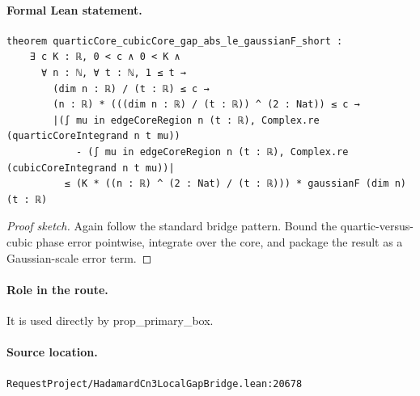 \medskip
\paragraph{Formal Lean statement.}
\begin{verbatim}
theorem quarticCore_cubicCore_gap_abs_le_gaussianF_short :
    ∃ c K : ℝ, 0 < c ∧ 0 < K ∧
      ∀ n : ℕ, ∀ t : ℕ, 1 ≤ t →
        (dim n : ℝ) / (t : ℝ) ≤ c →
        (n : ℝ) * (((dim n : ℝ) / (t : ℝ)) ^ (2 : Nat)) ≤ c →
        |(∫ mu in edgeCoreRegion n (t : ℝ), Complex.re (quarticCoreIntegrand n t mu))
            - (∫ mu in edgeCoreRegion n (t : ℝ), Complex.re (cubicCoreIntegrand n t mu))|
          ≤ (K * ((n : ℝ) ^ (2 : Nat) / (t : ℝ))) * gaussianF (dim n) (t : ℝ)
\end{verbatim}
\begin{proof}[Proof sketch]
Again follow the standard bridge pattern. Bound the quartic-versus-cubic phase error pointwise, integrate over the core, and package the result as a Gaussian-scale error term.
\end{proof}
\paragraph{Role in the route.}
It is used directly by prop\_primary\_box.
\paragraph{Source location.}
\texttt{RequestProject/HadamardCn3LocalGapBridge.lean:20678}
\medskip
